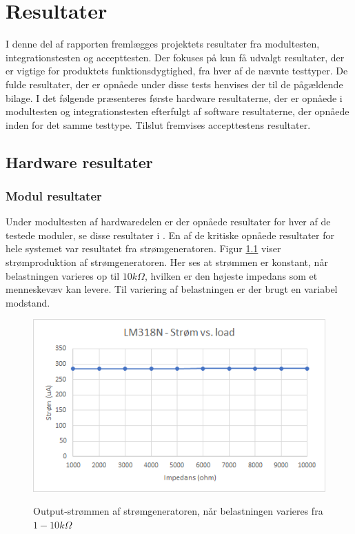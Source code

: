 \chapter{Resultater}

I denne del af rapporten fremlægges projektets resultater fra modultesten, integrationstesten og  accepttesten. Der fokuses på kun få udvalgt resultater, der er vigtige for produktets funktionsdygtighed,  fra hver af de nævnte testtyper. De fulde resultater, der er opnåede under disse tests henvises der til de pågældende bilage. I det følgende præsenteres første hardware resultaterne, der er opnåede i modultesten og integrationstesten efterfulgt af software resultaterne, der opnåede inden for det samme testtype. Tilslut fremvises accepttestens resultater.     

\section{Hardware resultater}
\subsection{Modul resultater}
Under modultesten af hardwaredelen er der opnåede resultater for hver af de testede moduler, se disse resultater i . En af de kritiske opnåede resultater for hele systemet var resultatet fra strømgeneratoren. Figur \ref{fig:Stromgeneratorload} viser strømproduktion af strømgeneratoren. Her ses at strømmen er konstant, når belastningen varieres op til $10k \Omega$, hvilken er den højeste impedans som et menneskevæv kan levere. Til variering af belastningen er der brugt en variabel modstand.        

\begin{figure}[H] 
\centering
{\includegraphics[width=12cm]
{Figure/Stromgeneratorload}}
\caption{Output-strømmen af strømgeneratoren, når belastningen varieres fra $1 - 10k\Omega$}
\label{fig:Stromgeneratorload}
\end{figure}


